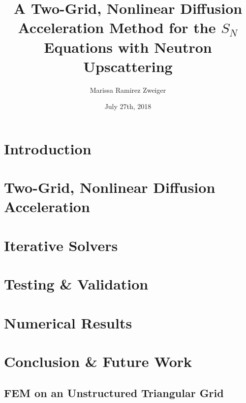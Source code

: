 \documentclass[12pt]{report}
\title{A Two-Grid, Nonlinear Diffusion Acceleration Method for the $S_N$ Equations with Neutron Upscattering}
\author{Marissa Ramirez Zweiger }
\date{July 27th, 2018}
\begin{document}
\maketitle


\tableofcontents



\chapter{Introduction}
\setcounter{page}{1}
\label{sec:intro}



\chapter{Two-Grid, Nonlinear Diffusion Acceleration}
\label{sec:derivation}


\chapter{Iterative Solvers}
\label{sec:iterative}


\chapter{Testing \& Validation}
\label{sec:testing}


\chapter{Numerical Results}
\label{sec:results}


\chapter{Conclusion \& Future Work}
\label{sec:future}


\begin{appendices}
  \chapter{FEM on an Unstructured Triangular Grid}
  \label{sec:spatial}
  
\end{appendices}



\end{document}
